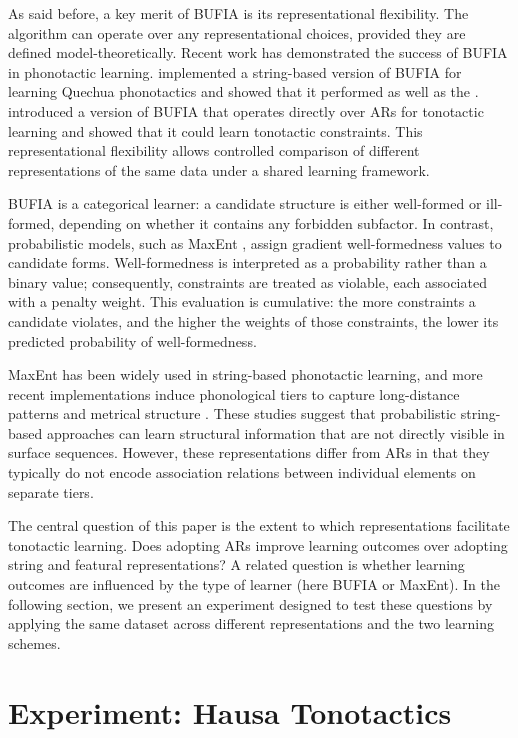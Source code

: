 As said before, a key merit of BUFIA is its representational flexibility.
The algorithm can operate over any representational choices,
provided they are defined model-theoretically.
Recent work has demonstrated the success of BUFIA in phonotactic learning.
\citet{Swanson+2026} implemented a string-based version of BUFIA
for learning Quechua phonotactics and showed that it performed
as well as the \citep{hayes2008maximum, wilson2018accidental}.
\citet{li2025learning} introduced a version of BUFIA that
operates directly over ARs for tonotactic learning and
showed that it could learn tonotactic constraints.
This representational flexibility allows controlled comparison 
of different representations of the same data under a shared 
learning framework.

BUFIA is a categorical learner: a candidate structure is
either well-formed or ill-formed,
depending on whether it contains any forbidden subfactor.
In contrast, probabilistic models, such as MaxEnt
\citep{hayes2008maximum}, assign gradient well-formedness values
to candidate forms. Well-formedness is interpreted as a probability
rather than a binary value; consequently, constraints are treated as 
violable, each associated with a penalty weight.
This evaluation is cumulative: the more constraints a candidate
violates, and the higher the weights of those constraints,
the lower its predicted probability of well-formedness.

MaxEnt has been widely used in string-based phonotactic learning, and more
recent implementations induce phonological tiers to capture long-distance
patterns \citep{GouskovaGallagher2020} and
metrical structure \citep{lee2025representing}.
These studies suggest that probabilistic string-based approaches can
learn structural information that are not directly visible in surface
sequences.
However, these representations differ from ARs in that
they typically do not encode association relations between
individual elements on separate tiers.

The central question of this paper is the extent to which
representations facilitate tonotactic learning.
Does adopting ARs improve learning outcomes over
adopting string and featural representations?
A related question is whether learning outcomes are influenced by
the type of learner (here BUFIA or MaxEnt).
In the following section, we present an experiment
designed to test these questions by applying the same dataset across
different representations and the two learning schemes.

\section{Experiment: Hausa Tonotactics}
\label{sec:experiment}

